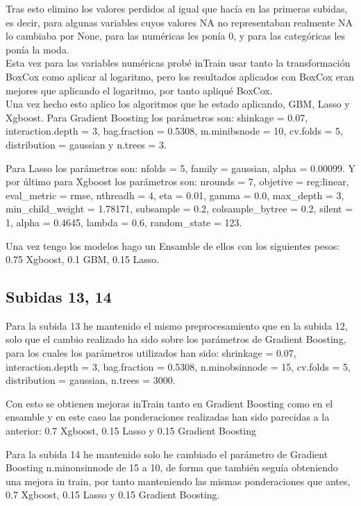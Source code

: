 \documentclass[14pt]{extarticle}
\begin{document}
Tras esto elimino los valores perdidos al igual que hacía en las primeras subidas, es decir, para algunas variables cuyos valores NA no representaban realmente NA lo cambiaba por None, para las numéricas les ponía 0, y para las categóricas les ponía la moda. \\


Esta vez para las variables numéricas probé inTrain usar tanto la transformación BoxCox como aplicar al logaritmo, pero los resultados aplicados con BoxCox eran mejores que aplicando el logaritmo, por tanto apliqué BoxCox.\\

Una vez hecho esto aplico los algoritmos que he estado aplicando, GBM, Lasso y Xgboost. Para Gradient Boosting los parámetros son: shinkage = 0.07, interaction.depth = 3, bag.fraction = 0.5308, m.minibsnode = 10, cv.folds = 5, distribution = gaussian y n.trees = 3.

Para Lasso los parámetros son: nfolds = 5, family = gaussian, alpha = 0.00099. Y por último para Xgboost los parámetros son: nrounds = 7, objetive = reg:linear, eval\_metric = rmse, nthreadh = 4, eta = 0.01, gamma = 0.0, max\_depth = 3, min\_child\_weight = 1.78171, subsample = 0.2, colsample\_bytree = 0.2, silent = 1, alpha = 0.4645, lambda = 0.6, random\_state = 123.

Una vez tengo los modelos hago un Ensamble de ellos con los siguientes pesos: 0.75 Xgboost, 0.1 GBM, 0.15 Lasso.

\subsection{Subidas 13, 14}

Para la subida 13 he mantenido el mismo preprocesamiento que en la subida 12, solo que el cambio realizado ha sido sobre los parámetros de Gradient Boosting, para los cuales los parámetros utilizados han sido: shrinkage = 0.07, interaction.depth = 3, bag.fraction = 0.5308, n.minobsinnode = 15, cv.folds = 5, distribution = gaussian, n.trees = 3000.

Con esto se obtienen mejoras inTrain tanto en Gradient Boosting como en el ensamble y en este caso las ponderaciones realizadas han sido parecidas a la anterior: 0.7 Xgboost, 0.15 Lasso y 0.15 Gradient Boosting 

Para la subida 14 he mantenido solo he cambiado el parámetro de Gradient Boosting n.minonsinnode de 15 a 10, de forma que también seguía obteniendo una mejora in train, por tanto manteniendo las mismas ponderaciones que antes, 0.7 Xgboost, 0.15 Lasso y 0.15 Gradient Boosting.
\end{document}
